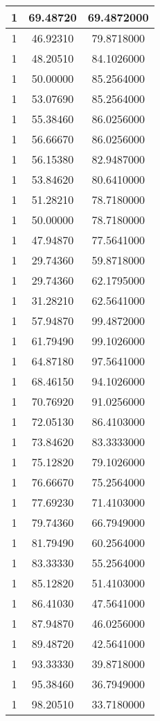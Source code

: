 \documentclass[
]{book}
\begin{document}
\begin{tabular}{c|c|c}
\hline
1 & 69.48720 & 69.4872000\\
\hline
1 & 46.92310 & 79.8718000\\
\hline
1 & 48.20510 & 84.1026000\\
\hline
1 & 50.00000 & 85.2564000\\
\hline
1 & 53.07690 & 85.2564000\\
\hline
1 & 55.38460 & 86.0256000\\
\hline
1 & 56.66670 & 86.0256000\\
\hline
1 & 56.15380 & 82.9487000\\
\hline
1 & 53.84620 & 80.6410000\\
\hline
1 & 51.28210 & 78.7180000\\
\hline
1 & 50.00000 & 78.7180000\\
\hline
1 & 47.94870 & 77.5641000\\
\hline
1 & 29.74360 & 59.8718000\\
\hline
1 & 29.74360 & 62.1795000\\
\hline
1 & 31.28210 & 62.5641000\\
\hline
1 & 57.94870 & 99.4872000\\
\hline
1 & 61.79490 & 99.1026000\\
\hline
1 & 64.87180 & 97.5641000\\
\hline
1 & 68.46150 & 94.1026000\\
\hline
1 & 70.76920 & 91.0256000\\
\hline
1 & 72.05130 & 86.4103000\\
\hline
1 & 73.84620 & 83.3333000\\
\hline
1 & 75.12820 & 79.1026000\\
\hline
1 & 76.66670 & 75.2564000\\
\hline
1 & 77.69230 & 71.4103000\\
\hline
1 & 79.74360 & 66.7949000\\
\hline
1 & 81.79490 & 60.2564000\\
\hline
1 & 83.33330 & 55.2564000\\
\hline
1 & 85.12820 & 51.4103000\\
\hline
1 & 86.41030 & 47.5641000\\
\hline
1 & 87.94870 & 46.0256000\\
\hline
1 & 89.48720 & 42.5641000\\
\hline
1 & 93.33330 & 39.8718000\\
\hline
1 & 95.38460 & 36.7949000\\
\hline
1 & 98.20510 & 33.7180000\\

\end{tabular}
\end{document}
